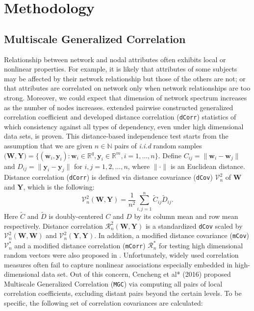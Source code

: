 \documentclass[12pt]{article}
\theoremstyle{definition}
\begin{document}
\bigskip
\section{Methodology}
\label{sec:method}

\subsection{Multiscale Generalized Correlation}

Relationship between network and nodal attributes often exhibits local or nonlinear properties. For example, it is likely that attributes of some subjects may be affected by their network relationship but those of the others are not; or that attributes are correlated on network only when network relationships are too strong. Moreover, we could expect that dimension of network spectrum increases as the number of nodes increases. \cite{szekely2007measuring} extended pairwise constructed generalized correlation coefficient and developed distance correlation (\texttt{dCorr}) statistics of which consistency against all types of dependency, even under high dimensional data sets, is proven. This distance-based independence test starts from the assumption that we are given $n \in \mathbb{N}$ pairs of \textit{i.i.d} random samples $\big(  \mathbf{W}, \mathbf{Y}  \big)  = \{ (\mathbf{w}_{i}, \mathbf{y}_{i}) : \mathbf{w}_{i} \in \mathbb{R}^{q}, \mathbf{y}_{i} \in \mathbb{R}^{m}, i = 1,...,n \}$. Define $C_{ij} = \parallel \mathbf{w}_{i} - \mathbf{w}_{j} \parallel$ and $D_{ij} = \parallel \mathbf{y}_{i} - \mathbf{y}_{j} \parallel$ for $i,j=1,2, \ldots ,n$, where $\parallel \cdot \parallel$ is an Euclidean distance. Distance correlation (\texttt{dCorr}) is defined via distance covariance (\texttt{dCov}) $\mathcal{V}^2_{n}$ of $\mathbf{W}$ and $\mathbf{Y}$, which is the following: 
\begin{equation}	 
\mathcal{V}^2_{n}(\mathbf{W}, \mathbf{Y}) = \frac{1}{n^2} \sum\limits_{i,j=1}^{n} \tilde{C}_{ij} \tilde{D}_{ij}.
\end{equation}
Here $\tilde{C}$ and $\tilde{D}$ is doubly-centered $C$ and $D$ by its column mean and row mean respectively. Distance correlation $\mathcal{R}^{2}_{n}(\mathbf{W}, \mathbf{Y})$ is a standardized \texttt{dCov} scaled by $\mathcal{V}^2_{n}(\mathbf{W}, \mathbf{W})$ and $\mathcal{V}^2_{n}(\mathbf{Y}, \mathbf{Y}).$ In addition, a modified distance covariance (\texttt{mCov}) $\mathcal{V}^*_{n}$ and a modified distance correlation (\texttt{mCorr}) $\mathcal{R}^{*}_{n}$ for testing high dimensional random vectors were also proposed in \cite{szekely2013distance}. Unfortunately, widely used correlation measures often fail to capture nonlinear associations especially embedded in high-dimensional data set. Out of this concern, Cencheng et al* (2016) proposed Multiscale Generalized Correlation (\texttt{MGC}) via computing all pairs of local correlation coefficients, excluding distant pairs beyond the certain levels. To be specific, the following set of correlation covariances are calculated:
\end{document}
